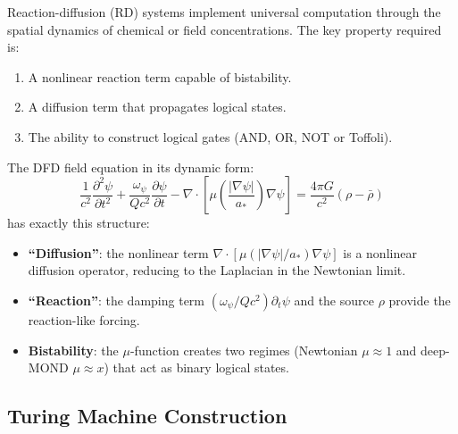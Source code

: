 \documentclass[11pt]{article}
\theoremstyle{definition}
\theoremstyle{remark}
\newcommand{\astar}{a_*}
\newcommand{\mufn}{\mu}
\begin{document}
Reaction-diffusion (RD) systems implement universal computation through
the spatial dynamics of chemical or field concentrations. The key property
required is:
\begin{enumerate}[label=(\arabic*)]
\item A nonlinear reaction term capable of bistability.
\item A diffusion term that propagates logical states.
\item The ability to construct logical gates (AND, OR, NOT or Toffoli).
\end{enumerate}

The DFD field equation in its dynamic form:
\begin{equation}
\frac{1}{c^2}\frac{\partial^2\psi}{\partial t^2} +
\frac{\omega_\psi}{Qc^2}\frac{\partial\psi}{\partial t}
- \nabla\cdot\!\left[\mufn\!\left(\frac{|\nabla\psi|}{\astar}\right)\nabla\psi\right]
= \frac{4\pi G}{c^2}(\rho - \bar\rho)
\label{eq:dfd_dynamic}
\end{equation}
has exactly this structure:
\begin{itemize}[nosep]
\item \textbf{``Diffusion''}: the nonlinear term
  $\nabla\cdot[\mufn(|\nabla\psi|/\astar)\nabla\psi]$ is a nonlinear
  diffusion operator, reducing to the Laplacian in the Newtonian limit.
\item \textbf{``Reaction''}: the damping term $(\omega_\psi/Qc^2)\partial_t\psi$
  and the source $\rho$ provide the reaction-like forcing.
\item \textbf{Bistability}: the $\mu$-function creates two regimes
  (Newtonian $\mu\approx1$ and deep-MOND $\mu\approx x$) that act as
  binary logical states.
\end{itemize}

\subsection{Turing Machine Construction}
\end{document}
